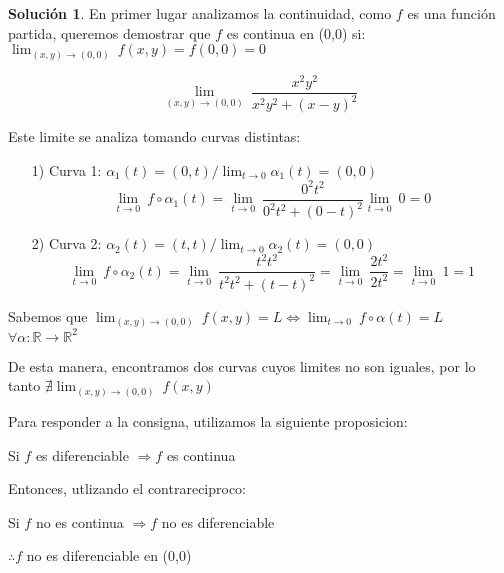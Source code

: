 \documentclass[10pt, a4paper]{report}
\renewcommand{\Re}{\mathbb {R}}
\theoremstyle{definition} %
\newtheorem{solution}{Solución}
\begin{document}
\begin{solution}
   En primer lugar analizamos la continuidad, como $f$ es una función partida, queremos demostrar que $f$ es continua en (0,0) si:  $\lim_{(x,y)\to(0,0)} \ f(x,y) = f(0,0)=0$
   
    \[
        \lim_{(x,y)\to(0,0)} \
         \frac{x^2y^2}{x^2y^2+(x-y)^2}
    \]

    Este limite se analiza tomando curvas distintas:

\begin{itemize}
    \item[1)] Curva 1: $\alpha_1(t)=(0,t) / \lim_{t\to0} \alpha_1(t) = (0,0)$
    \[
         \lim_{t\to0} \
          f\circ\alpha_1(t)=\lim_{t\to0} \
         \frac{0^2t^2}{0^2t^2+(0-t)^2}\lim_{t\to0} \
          0=0
    \]

     \item[2)]  Curva 2: $\alpha_2(t)=(t,t) / \lim_{t\to0} \alpha_2(t) = (0,0)$
     \[
         \lim_{t\to0} \
          f\circ\alpha_2(t)=\lim_{t\to0} \
         \frac{t^2t^2}{t^2t^2+(t-t)^2}=\lim_{t\to0} \
         \frac{2t^2}{2t^2}=\lim_{t\to0} \
         1=1
    \]
\end{itemize}
Sabemos que $\lim_{(x,y)\to(0,0)} \ f(x,y) = L \iff \lim_{t\to0} \ f\circ\alpha(t)=L  $          $ \forall\alpha:\Re\rightarrow\Re^2  $ 

   
De esta manera, encontramos dos curvas cuyos limites no son iguales, por lo tanto $\nexists \lim_{(x,y)\to(0,0)} \ f(x,y)$

Para responder a la consigna, utilizamos la siguiente proposicion:
 \begin{center} Si $f$ es diferenciable $\Rightarrow f$ es continua \end{center}

 Entonces, utlizando el contrareciproco: 
\begin{center}Si $f$ no es continua $\Rightarrow f$ no es diferenciable \end{center}

$\therefore f $ no es diferenciable en (0,0)
 
\end{solution}


\end{document}
